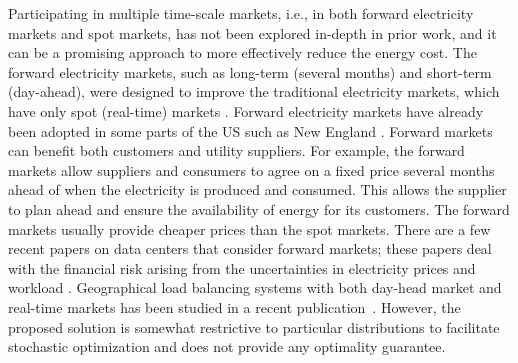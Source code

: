 Participating in multiple time-scale markets, i.e., in both forward electricity markets and spot markets, has not been explored in-depth in prior work, and it can be a promising approach to more effectively reduce the energy cost. The forward electricity markets, such as long-term (several months) and short-term (day-ahead), were designed to improve the traditional electricity markets, which have only spot (real-time) markets \cite{ausubel2010using}. Forward electricity markets have already been adopted in some parts of the US such as New England \cite{cramton2007colombia}. Forward markets can benefit both customers and utility suppliers. For example, the forward markets allow suppliers and consumers to agree on a fixed price several months ahead of when the electricity is produced and consumed. This allows the supplier to plan ahead and ensure the availability of energy for its customers. The forward markets usually provide cheaper prices than the spot markets. 
There are a few recent papers on data centers that consider forward markets; these papers deal with the financial risk arising from the uncertainties in electricity prices and workload \cite{rao2011hedging,yu2012risk}. 
Geographical load balancing systems with both day-head market and real-time markets has been studied in a recent publication~\cite{ghamkhari2016energy}. However, the proposed solution is somewhat restrictive to particular distributions to facilitate stochastic optimization and does not provide any optimality guarantee.




